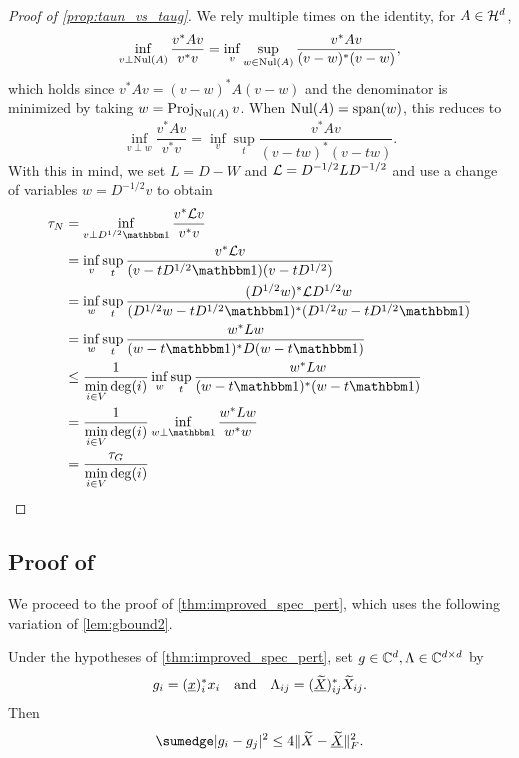 \begin{proof}[Proof of \cref{prop:taun_vs_taug}]
  We rely multiple times on the identity, for $A \in \mathcal{H}^d$, \[\inf_{v \perp \operatorname{Nul}(A)} \dfrac{v^* A v}{v^* v} = \inf_v \sup_{w \in \operatorname{Nul}(A)} \dfrac{v^* A v}{(v - w)^*(v - w)},\] which holds since $v^* A v = (v - w)^* A (v - w)$ and the denominator is minimized by taking $w = \operatorname{Proj}_{\operatorname{Nul}(A)} v$.  When $\operatorname{Nul}(A) = \operatorname{span}(w)$, this reduces to \[\inf_{v \perp w} \dfrac{v^* A v}{v^* v} = \inf_v \sup_t \dfrac{v^* A v}{(v - t w)^* (v - t w)}.\]  With this in mind, we set $L = D - W$ and $\mathcal{L} = D^{-1/2} L D^{-1/2}$ and use a change of variables $w = D^{-1 / 2} v$ to obtain
  \begin{align*}
    \tau_N &= \inf_{v \perp D^{1 / 2} \one} \dfrac{v^* \Lc v}{v^* v} \\
    &= \inf_v \sup_t \dfrac{v^* \Lc v}{(v - t D^{1 / 2} \one)(v - t D^{1 /2})} \\
    &= \inf_w \sup_t \dfrac{(D^{1 / 2} w)^* \Lc D^{1 / 2} w}{(D^{1 / 2} w - t D^{1 / 2} \one)^* (D^{1 / 2} w - t D^{1 / 2} \one)} \\
    &= \inf_w \sup_t \dfrac{w^* L w}{(w - t \one)^* D (w - t \one)} \\
    &\le \dfrac{1}{\min\limits_{i \in V} \deg(i)} \inf_w \sup_t \dfrac{w^* L w}{(w - t \one)^* (w - t \one)} \\
    &= \dfrac{1}{\min\limits_{i \in V} \deg(i)} \inf_{w \perp \one} \dfrac{w^* L w}{w^* w} \\
    &= \dfrac{\tau_G}{\min\limits_{i \in V} \deg(i)}
  \end{align*}
\end{proof}



\subsection{Proof of }
We proceed to the proof of \cref{thm:improved_spec_pert}, which uses the following variation of \cref{lem:gbound2}.

\begin{lemma}
  Under the hypotheses of \cref{thm:improved_spec_pert}, set $g \in \mathbb{C}^d, \Lambda \in \mathbb{C}^{d \times d}$ by \[g_i = (\underline{x})^*_i x_i \quad \text{and} \quad \Lambda_{ij} = (\underline{\widetilde{X}})^*_{ij} \widetilde{X}_{ij}.\]  Then \[ \sumedge \abs{g_i - g_j}^2 \le 4 \norm{\tX - \utX}_F^2.\]
  \label{lem:gi_improved}
\end{lemma}

